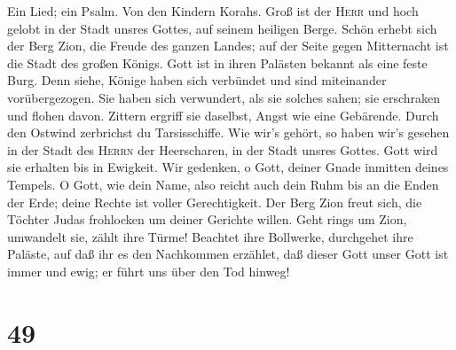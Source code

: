  Ein Lied; ein Psalm. Von den Kindern Korahs. Groß ist der
\textsc{Herr} und hoch gelobt in der Stadt unsres Gottes, auf seinem
heiligen Berge.  Schön erhebt sich der Berg Zion, die
Freude des ganzen Landes; auf der Seite gegen Mitternacht ist die Stadt
des großen Königs.  Gott ist in ihren Palästen bekannt als
eine feste Burg.  Denn siehe, Könige haben sich verbündet
und sind miteinander vorübergezogen.  Sie haben sich
verwundert, als sie solches sahen; sie erschraken und flohen davon.
 Zittern ergriff sie daselbst, Angst wie eine Gebärende.
 Durch den Ostwind zerbrichst du Tarsisschiffe.
 Wie wir's gehört, so haben wir's gesehen in der Stadt des
\textsc{Herrn} der Heerscharen, in der Stadt unsres Gottes. Gott wird
sie erhalten bis in Ewigkeit.  Wir gedenken, o Gott,
deiner Gnade inmitten deines Tempels.  O Gott, wie dein
Name, also reicht auch dein Ruhm bis an die Enden der Erde; deine Rechte
ist voller Gerechtigkeit.  Der Berg Zion freut sich, die
Töchter Judas frohlocken um deiner Gerichte willen.  Geht
rings um Zion, umwandelt sie, zählt ihre Türme!  Beachtet
ihre Bollwerke, durchgehet ihre Paläste, auf daß ihr es den Nachkommen
erzählet,  daß dieser Gott unser Gott ist immer und ewig;
er führt uns über den Tod hinweg!

\hypertarget{section-48}{%
\section{49}\label{section-48}}

